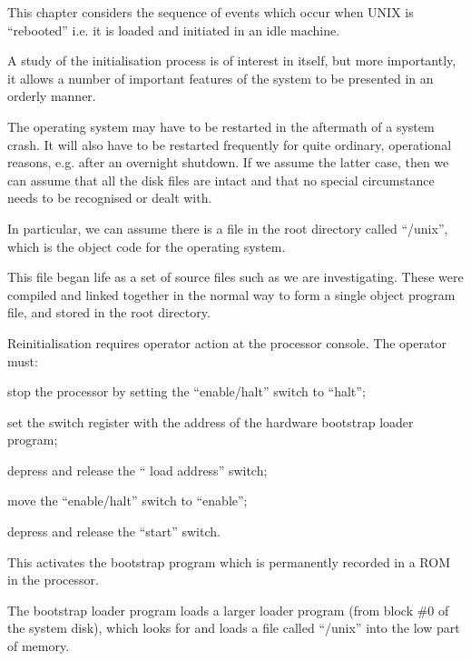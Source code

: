 %
%

This chapter considers the sequence of
events which occur when UNIX is
``rebooted'' i.e. it is loaded and initiated in an idle machine.

A study of the initialisation process
is of interest in itself, but more
importantly, it allows a number of
important features of the system to be
presented in an orderly manner.

The operating system may have to be
restarted in the aftermath of a system
crash. It will also have to be restarted frequently for quite ordinary,
operational reasons, e.g. after an
overnight shutdown. If we assume the
latter case, then we can assume that
all the disk files are intact and that
no special circumstance needs to be
recognised or dealt with.

In particular, we can assume there is a
file in the root directory called
``/unix'', which is the object code for
the operating system.

This file began life as a set of source
files such as we are investigating.
These were compiled and linked together
in the normal way to form a single
object program file, and stored in the
root directory.


Reinitialisation requires operator
action at the processor console. The
operator must:

\bi
\item stop the processor by setting the
``enable/halt'' switch to ``halt'';

\item set the switch register with the
address of the hardware bootstrap
loader program;

\item depress and release the `` load address'' switch;

\item move the ``enable/halt'' switch to
``enable'';

\item depress and release the ``start''
switch.
\ei

This activates the bootstrap program
which is permanently recorded in a ROM
in the processor.

The bootstrap loader program loads a
larger loader program (from block \#0 of
the system disk), which looks for and
loads a file called ``/unix'' into the
low part of memory.

